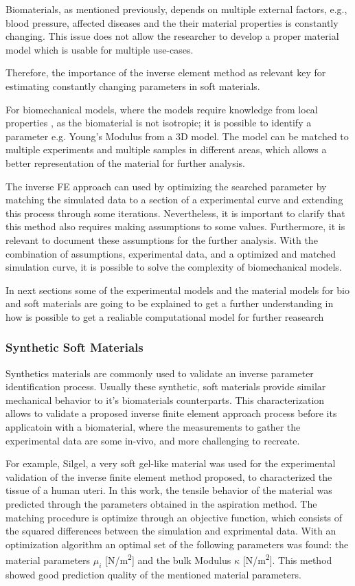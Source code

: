 Biomaterials, as mentioned previously, depends on multiple external factors, e.g., blood 
pressure, affected diseases and the their material properties is constantly changing. 
This issue does not allow the researcher to develop a proper material model which is 
usable for multiple use-cases. 

Therefore, the importance of the inverse element method as relevant key for estimating 
constantly changing parameters in soft materials.

For biomechanical models, where the models require knowledge from local properties \cite{Chai2013},
as the biomaterial is not isotropic; it is possible to identify a parameter e.g. Young's Modulus 
from a 3D model. The model can be matched to multiple experiments and multiple samples in different areas,
which allows a better representation of the material for further analysis.

The inverse FE approach can used by optimizing the searched parameter by matching the simulated data
to a section of a experimental curve and extending this process through some iterations. 
Nevertheless, it is important to clarify that this method also requires making assumptions to some values.
Furthermore, it is relevant to document these assumptions for the further analysis. 
With the combination of assumptions, experimental data, and a optimized and matched simulation curve, it
is possible to solve the complexity of biomechanical models.
 
In next sections some of the experimental models and the material models for bio and soft materials are 
going to be explained to get a further understanding in how is possible to get a realiable computational 
model for further reasearch

\subsubsection*{Synthetic Soft Materials}

Synthetics materials are commonly used to validate an inverse parameter identification process. 
Usually these synthetic, soft materials provide similar mechanical behavior to it's biomaterials 
counterparts. This characterization allows to validate a proposed inverse finite element approach process
before its applicatoin with a biomaterial, where the measurements to gather the experimental data are 
some in-vivo, and more challenging to recreate.


For example, Silgel, a very soft gel-like material \cite{Kauer2002} was used for the experimental 
validation of the inverse finite element method proposed, to characterized the tissue of 
a human uteri. In this work, the tensile behavior of the material was predicted through the 
parameters obtained in the aspiration method. The matching procedure is optimize through 
an objective function, which consists of the squared differences between the simulation 
and exprimental data. With an optimization algorithm an optimal set of the following parameters 
was found: the material parameters \(\mu_i\) [N/m\textsuperscript{2}] and the bulk Modulus
\(\kappa\) [N/m\textsuperscript{2}]. This method showed good prediction quality of the mentioned 
material parameters.

